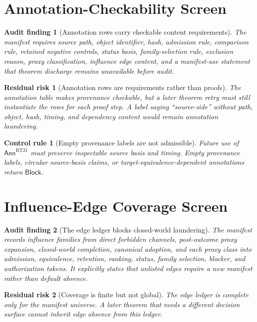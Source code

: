 \documentclass[11pt]{article}
\newcommand{\Annot}{\mathsf{Ann}}
\newcommand{\Block}{\mathsf{Block}}
\newtheorem{auditfinding}{Audit finding}
\newtheorem{residualrisk}{Residual risk}
\newtheorem{controlrule}{Control rule}
\begin{document}
\section{Annotation-Checkability Screen}

\begin{auditfinding}[Annotation rows carry checkable content requirements]
The manifest requires source path, object identifier, hash, admission rule,
comparison rule, retained negative controls, status basis, family-selection
rule, exclusion reason, proxy classification, influence edge content, and a
manifest-use statement that theorem discharge remains unavailable before
audit.
\end{auditfinding}

\begin{residualrisk}[Annotation rows are requirements rather than proofs]
The annotation table makes provenance checkable, but a later theorem retry
must still instantiate the rows for each proof step. A label saying
``source-side'' without path, object, hash, timing, and dependency content
would remain annotation laundering.
\end{residualrisk}

\begin{controlrule}[Empty provenance labels are not admissible]
Future use of \(\Annot^{\mathrm{RT21}}\) must preserve inspectable source
basis and timing. Empty provenance labels, circular source-basis claims, or
target-equivalence-dependent annotations return \(\Block\).
\end{controlrule}

\section{Influence-Edge Coverage Screen}

\begin{auditfinding}[The edge ledger blocks closed-world laundering]
The manifest records influence families from direct forbidden channels,
post-outcome proxy expansion, closed-world completion, canonical adoption,
and each proxy class into admission, equivalence, retention, ranking,
status, family selection, blocker, and authorization tokens. It explicitly
states that unlisted edges require a new manifest rather than default
absence.
\end{auditfinding}

\begin{residualrisk}[Coverage is finite but not global]
The edge ledger is complete only for the manifest universe. A later theorem
that needs a different decision surface cannot inherit edge absence from
this ledger.
\end{residualrisk}
\end{document}
